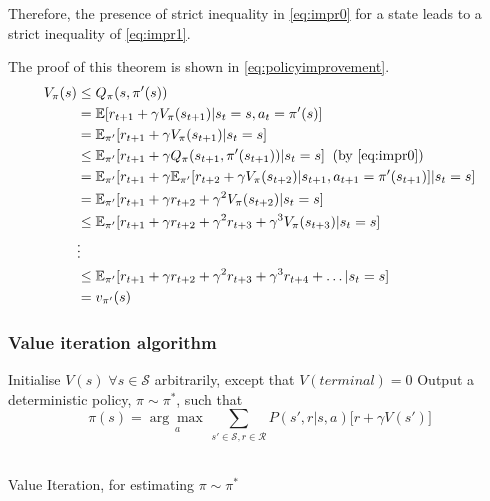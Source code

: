 Therefore, the presence of strict inequality in \vref{eq:impr0} for a state leads to a strict inequality of \vref{eq:impr1}.

The proof of this theorem is shown in \vref{eq:policyimprovement}.
\begin{align}\label{eq:policyimprovement}
\begin{split}
V_\pi(s) &\le Q_\pi(s, \pi'(s))\\
		&= \mathbb{E}[r_{t+1} + \gamma V_\pi(s_{t+1})| s_t = s, a_t = \pi'(s)]\\
		&= \mathbb{E}_{\pi'}[r_{t+1} + \gamma V_\pi(s_{t+1})| s_t = s]\\
		&\le \mathbb{E}_{\pi'}[r_{t+1} + \gamma Q_\pi(s_{t+1}, \pi'(s_{t+1}))| s_t = s] \; \; \text{(by \ref{eq:impr0})}\\
		&= \mathbb{E}_{\pi'}[r_{t+1} + \gamma \mathbb{E}_{\pi'}[r_{t+2}+ \gamma V_\pi(s_{t+2})| s_{t+1}, a_{t+1} = \pi'(s_{t+1})]| s_t = s]\\
		&= \mathbb{E}_{\pi'}[r_{t+1} + \gamma r_{t+2} + \gamma^2 V_\pi(s_{t+2})| s_t = s]\\
		&\le \mathbb{E}_{\pi'}[r_{t+1} + \gamma r_{t+2} + \gamma^2 r_{t+3} + \gamma^3 V_\pi(s_{t+3})| s_t = s]\\
		&\vdots\\
		&\le \mathbb{E}_{\pi'}[r_{t+1} + \gamma r_{t+2} + \gamma^2 r_{t+3} + \gamma^3 r_{t+4} + \dots| s_t = s]\\
		&= v_{\pi'}(s)
\end{split}
\end{align}

\subsubsection{Value iteration algorithm}

\begin{algorithm}[!htp]
	\SetAlgoLined
	\DontPrintSemicolon
	\LinesNumbered
	Initialise $V(s) \; \forall s \in \mathcal{S}$ arbitrarily, except that $V(terminal) = 0$\;
	Output a deterministic policy, $\pi \sim \pi^*$, such that \[
	\pi(s) = \underset{a}{\arg\max\,} \sum_{s' \in \mathcal{S}, r \in \mathcal{R}} P(s', r|s,a) \big[r+\gamma V(s')\big]\]\\
	\caption{Value Iteration, for estimating $\pi \sim \pi^*$}
	\label{value_iteration}
\end{algorithm}


